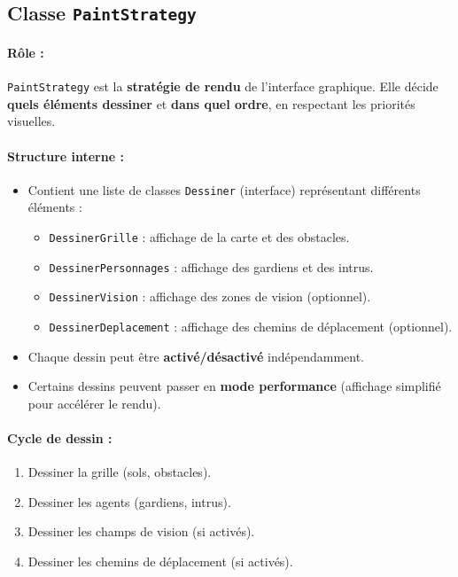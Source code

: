 \bigskip

\subsection{Classe \texttt{PaintStrategy}}

\paragraph{Rôle :}  
\texttt{PaintStrategy} est la \textbf{stratégie de rendu} de l’interface graphique.  
Elle décide \textbf{quels éléments dessiner} et \textbf{dans quel ordre}, en respectant les priorités visuelles.

\paragraph{Structure interne :}
\begin{itemize}
    \item Contient une liste de classes \texttt{Dessiner} (interface) représentant différents éléments :
    \begin{itemize}
        \item \texttt{DessinerGrille} : affichage de la carte et des obstacles.
        \item \texttt{DessinerPersonnages} : affichage des gardiens et des intrus.
        \item \texttt{DessinerVision} : affichage des zones de vision (optionnel).
        \item \texttt{DessinerDeplacement} : affichage des chemins de déplacement (optionnel).
    \end{itemize}
    \item Chaque dessin peut être \textbf{activé/désactivé} indépendamment.
    \item Certains dessins peuvent passer en \textbf{mode performance} (affichage simplifié pour accélérer le rendu).
\end{itemize}

\paragraph{Cycle de dessin :}
\begin{enumerate}
    \item Dessiner la grille (sols, obstacles).
    \item Dessiner les agents (gardiens, intrus).
    \item Dessiner les champs de vision (si activés).
    \item Dessiner les chemins de déplacement (si activés).
\end{enumerate}

